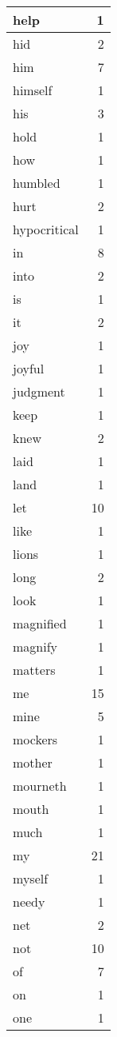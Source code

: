 \begin{center}
\begin{longtable}{l|r}
help & 1 \\ \hline
hid & 2 \\ \hline
him & 7 \\ \hline
himself & 1 \\ \hline
his & 3 \\ \hline
hold & 1 \\ \hline
how & 1 \\ \hline
humbled & 1 \\ \hline
hurt & 2 \\ \hline
hypocritical & 1 \\ \hline
in & 8 \\ \hline
into & 2 \\ \hline
is & 1 \\ \hline
it & 2 \\ \hline
joy & 1 \\ \hline
joyful & 1 \\ \hline
judgment & 1 \\ \hline
keep & 1 \\ \hline
knew & 2 \\ \hline
laid & 1 \\ \hline
land & 1 \\ \hline
let & 10 \\ \hline
like & 1 \\ \hline
lions & 1 \\ \hline
long & 2 \\ \hline
look & 1 \\ \hline
magnified & 1 \\ \hline
magnify & 1 \\ \hline
matters & 1 \\ \hline
me & 15 \\ \hline
mine & 5 \\ \hline
mockers & 1 \\ \hline
mother & 1 \\ \hline
mourneth & 1 \\ \hline
mouth & 1 \\ \hline
much & 1 \\ \hline
my & 21 \\ \hline
myself & 1 \\ \hline
needy & 1 \\ \hline
net & 2 \\ \hline
not & 10 \\ \hline
of & 7 \\ \hline
on & 1 \\ \hline
one & 1 \\ \hline

\end{longtable}
\end{center}
